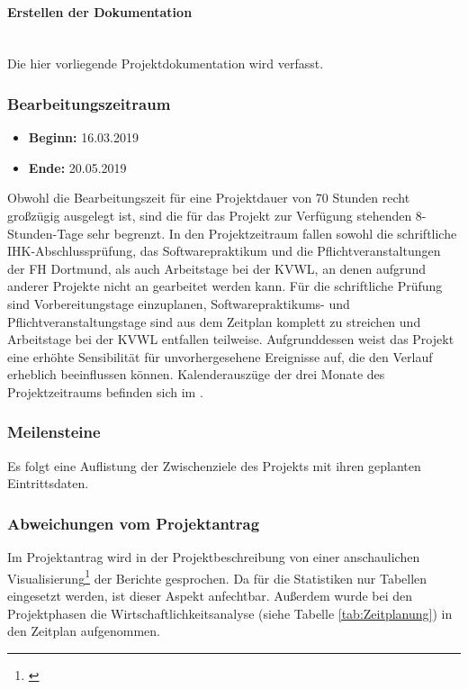 \paragraph{Erstellen der Dokumentation} ~\\
\label{p:Dokumentation}
Die hier vorliegende Projektdokumentation wird verfasst.

\subsubsection{Bearbeitungszeitraum}
\label{sec:Bearbeitungszeitraum}
\begin{itemize}
	\item \textbf{Beginn:} 16.03.2019
	\item \textbf{Ende:} 20.05.2019
\end{itemize}
Obwohl die Bearbeitungszeit für eine Projektdauer von 70 Stunden recht großzügig ausgelegt ist, sind die für das Projekt zur Verfügung stehenden 8-Stunden-Tage sehr begrenzt. In den Projektzeitraum fallen sowohl die schriftliche IHK-Abschlussprüfung, das Softwarepraktikum und die Pflichtveranstaltungen der \ac{FH} Dortmund, als auch Arbeitstage bei der \ac{KVWL}, an denen aufgrund anderer Projekte nicht an \projektName gearbeitet werden kann. Für die schriftliche Prüfung sind Vorbereitungstage einzuplanen, Softwarepraktikums- und Pflichtveranstaltungstage sind aus dem Zeitplan komplett zu streichen und Arbeitstage bei der \ac{KVWL} entfallen \ggfs teilweise.
Aufgrunddessen weist das Projekt eine erhöhte Sensibilität für unvorhergesehene Ereignisse auf, die den Verlauf erheblich beeinflussen können.
Kalenderauszüge der drei Monate des Projektzeitraums befinden sich im .

\subsubsection{Meilensteine}
\label{sec:Meilensteine}
Es folgt eine Auflistung der Zwischenziele des Projekts mit ihren geplanten Eintrittsdaten.

\subsubsection{Abweichungen vom Projektantrag}
\label{sec:AbweichungenProjektantrag}
Im Projektantrag wird in der Projektbeschreibung von einer anschaulichen Visualisierung\footnote{\cite{Projektantrag}} der Berichte gesprochen. Da für die Statistiken nur Tabellen eingesetzt werden, ist dieser Aspekt anfechtbar.
Außerdem wurde bei den Projektphasen die Wirtschaftlichkeitsanalyse (siehe Tabelle \ref{tab:Zeitplanung}) in den Zeitplan aufgenommen.

\newpage
